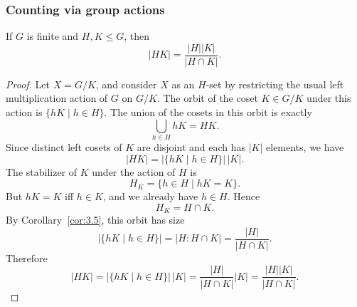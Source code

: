 \documentclass[../Odyssey_Project.tex]{subfiles}
\begin{document}
\subsubsection*{Counting via group actions}


\begin{proposition}
\label{prop:3.12}
If $G$ is finite and $H, K \leq G$, then
\[ |HK| = \frac{|H||K|}{|H \cap K|}. \]
\end{proposition}

\begin{proof}
    Let $X = G/K$, and consider $X$ as an $H$-set by restricting the usual left multiplication action of $G$ on $G/K$. The orbit of the coset $K \in G/K$ under this action is $\{hK \mid h \in H\}$.
    The union of the cosets in this orbit is exactly
    \[
        \bigcup_{h \in H} hK = HK.
    \]
    Since distinct left cosets of $K$ are disjoint and each has $|K|$ elements, we have
    \[
        |HK| = |\{hK \mid h \in H\}|\,|K|.
    \]
    The stabilizer of $K$ under the action of $H$ is
    \[
        H_K = \{h \in H \mid hK = K\}.
    \]
    But $hK = K$ iff $h \in K$, and we already have $h \in H$. Hence
    \[
        H_K = H \cap K.
    \]
    By Corollary~\ref{cor:3.5}, this orbit has size
    \[
        |\{hK \mid h \in H\}| = |H : H \cap K| = \frac{|H|}{|H \cap K|}.
    \]
    Therefore
    \[
        |HK| = |\{hK \mid h \in H\}|\,|K| = \frac{|H|}{|H \cap K|}|K| = \frac{|H||K|}{|H \cap K|}.
    \]
\end{proof}
\end{document}
